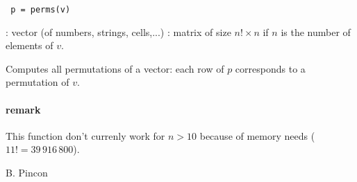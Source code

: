 
\begin{mandesc}
\end{mandesc}

\begin{calling_sequence}
\begin{verbatim}
 p = perms(v)
\end{verbatim}
\end{calling_sequence}

\begin{parameters}
  \begin{varlist}
    : vector (of numbers, strings, cells,...)
    : matrix of size $n! \times n$ if $n$ is the number of
               elements of $v$.
  \end{varlist}
\end{parameters}

\begin{mandescription}
  Computes all permutations of a vector: each row of $p$
  corresponds to a permutation of $v$. 

\paragraph{remark}
This function don't currenly work for $n > 10$ because of memory
needs ($11! = 39\,916\,800$).

\end{mandescription}

\begin{examples}
\begin{program}
\end{program}
\end{examples}



\begin{authors}
B. Pincon
\end{authors}

